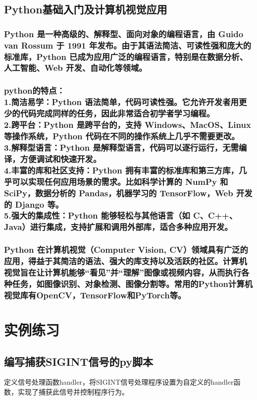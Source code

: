 \documentclass[UTF8,a4paper]{ctexart}
\begin{document}
\begin{sloppypar}
	\newpage
	
	\subsection{Python基础入门及计算机视觉应用}
	\subsubsection{Python 是一种高级的、解释型、面向对象的编程语言，由 Guido van Rossum 于 1991 年发布。由于其语法简洁、可读性强和庞大的标准库，Python 已成为应用广泛的编程语言，特别是在数据分析、人工智能、Web 开发、自动化等领域。}
	\subsubsection{python的特点：\\1.简洁易学：Python 语法简单，代码可读性强。它允许开发者用更少的代码完成同样的任务，因此非常适合初学者学习编程。\\2.跨平台：Python 是跨平台的，支持 Windows、MacOS、Linux 等操作系统，Python 代码在不同的操作系统上几乎不需要更改。\\3.解释型语言：Python 是解释型语言，代码可以逐行运行，无需编译，方便调试和快速开发。\\4.丰富的库和社区支持：Python 拥有丰富的标准库和第三方库，几乎可以实现任何应用场景的需求。比如科学计算的 NumPy 和 SciPy，数据分析的 Pandas，机器学习的 TensorFlow，Web 开发的 Django 等。\\5.强大的集成性：Python 能够轻松与其他语言（如 C、C++、Java）进行集成，支持扩展和调用外部库，适合多种应用开发。}
	\subsubsection{Python 在计算机视觉（Computer Vision, CV）领域具有广泛的应用，得益于其简洁的语法、强大的库支持以及活跃的社区。计算机视觉旨在让计算机能够“看见”并“理解”图像或视频内容，从而执行各种任务，如图像识别、对象检测、图像分割等。常用的Python计算机视觉库有OpenCV，TensorFlow和PyTorch等。}
	
	\newpage
	\graphicspath{{picture/}}

	
	\section{实例练习}
	\subsection{编写捕获SIGINT信号的py脚本}
	定义信号处理函数handler，将SIGINT信号处理程序设置为自定义的handler函数，实现了捕获此信号并控制程序行为。


\end{sloppypar}
\end{document}
